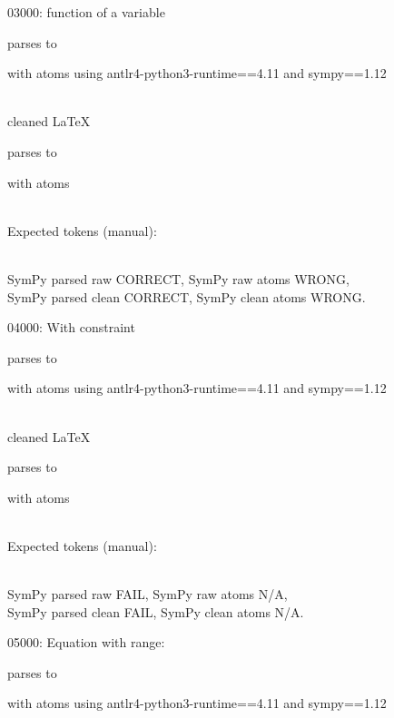 \documentclass{article}
\begin{document}
\hrulefill

03000:
function of a variable

parses to

with atoms
using antlr4-python3-runtime==4.11 and sympy==1.12

\ \\
cleaned \LaTeX

parses to

with atoms


\ \\
Expected tokens (manual):


\ \\
SymPy parsed raw CORRECT, 
SymPy raw atoms WRONG, \\
SymPy parsed clean CORRECT, 
SymPy clean atoms WRONG.

\hrulefill

04000:
With constraint

parses to

with atoms
using antlr4-python3-runtime==4.11 and sympy==1.12

\ \\
cleaned \LaTeX

parses to

with atoms


\ \\
Expected tokens (manual):


\ \\
SymPy parsed raw FAIL, 
SymPy raw atoms N/A, \\
SymPy parsed clean FAIL, 
SymPy clean atoms N/A.

\hrulefill

05000:
Equation with range:

parses to

with atoms
using antlr4-python3-runtime==4.11 and sympy==1.12
\end{document}
